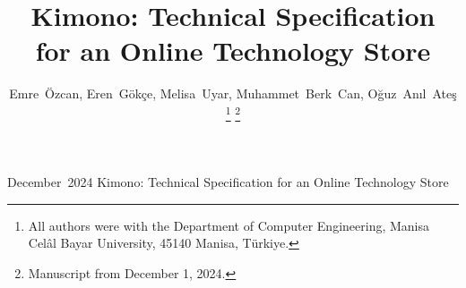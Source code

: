 \documentclass[twoside,a4paper,journal]{IEEEtran}
\begin{document}
%
\title{Kimono: Technical Specification\\for an Online Technology Store}
%
%
%

\author{
Emre~Özcan,
Eren~Gökçe,
Melisa~Uyar,
Muhammet~Berk~Can,
Oğuz~Anıl~Ateş%
\thanks{All authors were with the Department of Computer Engineering,
Manisa Celâl Bayar University, 45140 Manisa, Türkiye.}%
\thanks{Manuscript from December 1, 2024.}%
}

%
%



\markboth%
{December~2024}%
{Kimono: Technical Specification for an Online Technology Store}
%
\end{document}
